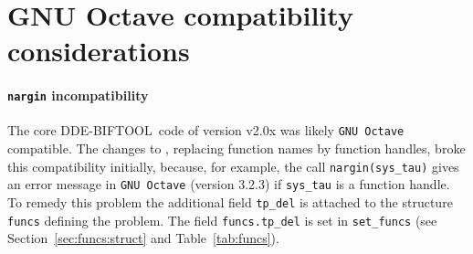 \documentclass[10pt]{scrartcl}
\newcommand{\DDEBIFCODE}{\textsc{DDE-BIFTOOL}}
\newcommand{\blist}[1]{\mbox{\lstinline!#1!}}
\begin{document}
{%


\section{GNU Octave compatibility  considerations}
\label{sec:octave}
\paragraph{\blist{nargin} incompatibility} The core \DDEBIFCODE\ code
of version v2.0x was likely \texttt{GNU Octave} compatible. The changes to \version{},
replacing function names by function handles, broke this compatibility
initially, because, for example, the call \blist{nargin(sys_tau)}
gives an error message in \texttt{GNU Octave} (version 3.2.3) if
\blist{sys_tau} is a function handle. To remedy this problem the
additional field \blist{tp_del} is attached to the structure
\blist{funcs} defining the problem. The field \blist{funcs.tp_del} is
set in \blist{set_funcs} (see Section~\ref{sec:funcs:struct} and
Table~\ref{tab:funcs}).

}
\end{document}
